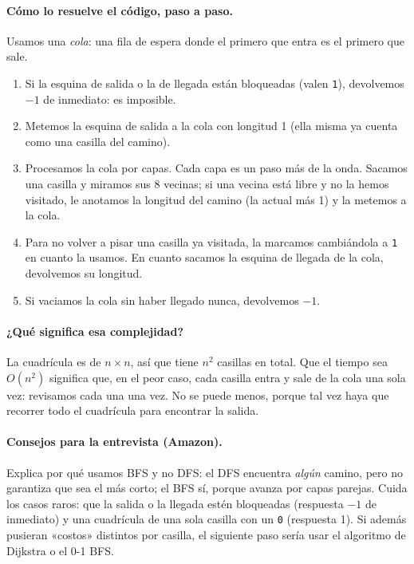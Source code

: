 \paragraph{Cómo lo resuelve el código, paso a paso.} Usamos una \emph{cola}:
una fila de espera donde el primero que entra es el primero que sale.
\begin{enumerate}
  \item Si la esquina de salida o la de llegada están bloqueadas
        (valen \texttt{1}), devolvemos $-1$ de inmediato: es imposible.
  \item Metemos la esquina de salida a la cola con longitud 1 (ella misma ya
        cuenta como una casilla del camino).
  \item Procesamos la cola por capas. Cada capa es un paso más de la onda.
        Sacamos una casilla y miramos sus 8 vecinas; si una vecina está libre y
        no la hemos visitado, le anotamos la longitud del camino (la actual más
        1) y la metemos a la cola.
  \item Para no volver a pisar una casilla ya visitada, la marcamos cambiándola
        a \texttt{1} en cuanto la usamos. En cuanto sacamos la esquina de
        llegada de la cola, devolvemos su longitud.
  \item Si vaciamos la cola sin haber llegado nunca, devolvemos $-1$.
\end{enumerate}




\paragraph{¿Qué significa esa complejidad?} La cuadrícula es de $n\times n$, así
que tiene $n^2$ casillas en total. Que el tiempo sea $O(n^2)$ significa que, en
el peor caso, cada casilla entra y sale de la cola una sola vez: revisamos cada
una una vez. No se puede menos, porque tal vez haya que recorrer todo el
cuadrícula para encontrar la salida.

\paragraph{Consejos para la entrevista (Amazon).} Explica por qué usamos BFS y
no DFS: el DFS encuentra \emph{algún} camino, pero no garantiza que sea el más
corto; el BFS
sí, porque avanza por capas parejas. Cuida los casos raros: que la salida o la
llegada estén bloqueadas (respuesta $-1$ de inmediato) y una cuadrícula de una sola
casilla con un \texttt{0} (respuesta 1). Si además pusieran «costos» distintos
por casilla, el siguiente paso sería usar el algoritmo de Dijkstra o el 0-1
BFS.
